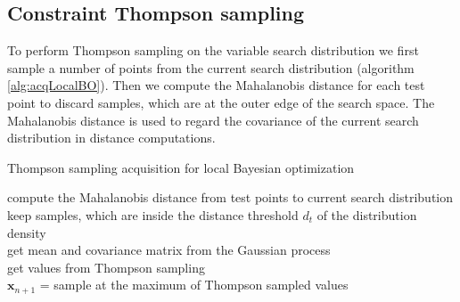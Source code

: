 %


\subsection{Constraint Thompson sampling}

To perform Thompson sampling on the variable search distribution we first sample a number of points from the current search distribution (algorithm \ref{alg:acqLocalBO}). Then we compute the Mahalanobis distance for each test point to discard samples, which are at the outer edge of the search space. The Mahalanobis distance is used to regard the covariance of the current search distribution in distance computations.

\begin{algorithm}
    \caption{Thompson sampling acquisition for local Bayesian optimization\label{alg:acqLocalBO}}
    \BlankLine

    compute the Mahalanobis distance from test points to current search distribution\\
    keep samples, which are inside the distance threshold $d_t$ of the distribution density\\
    get mean and covariance matrix from the Gaussian process\\
    get values from Thompson sampling\\
    $\mathbf{x}_{n+1}$ = sample at the maximum of Thompson sampled values\\
\end{algorithm}

